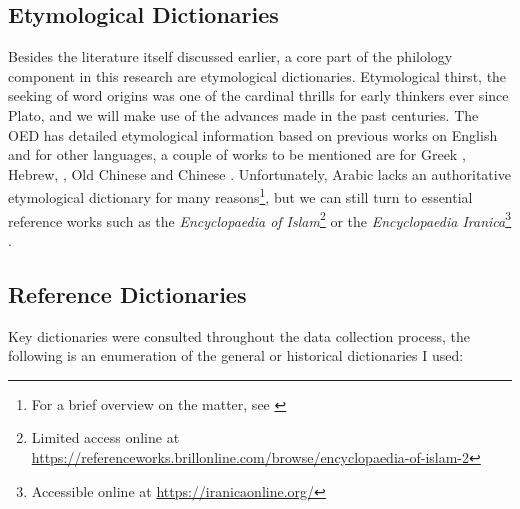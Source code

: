 


\subsection{Etymological Dictionaries}

Besides the literature itself discussed earlier, a core part of the philology component in this research are etymological dictionaries. Etymological thirst, the seeking of word origins was one of the cardinal thrills for early thinkers ever since Plato, and we will make use of the advances made in the past centuries. The \gls{OED} has detailed etymological information based on previous works on English and for other languages, a couple of works to be mentioned are for Greek \textcite{beekes_etymological_2010}, Hebrew, \textcite{klein_comprehensive_1987}, Old Chinese \textcite{schuessler_abc_2007} and Chinese \textcite{liu__1985}. Unfortunately, Arabic lacks an authoritative etymological dictionary for many reasons\footnote{For a brief overview on the matter, see \textcite{blazek_etymology_2006}}, but we can still turn to essential reference works such as the \textit{Encyclopaedia of Islam}\footnote{Limited access online at \url{https://referenceworks.brillonline.com/browse/encyclopaedia-of-islam-2}} \autocite{ei2} or the \textit{Encyclopaedia Iranica}\footnote{Accessible online at \url{https://iranicaonline.org/}} \autocite{eir}. 



\subsection{Reference Dictionaries}

Key dictionaries were consulted throughout the data collection process, the following is an enumeration of the general or historical dictionaries I used: 




